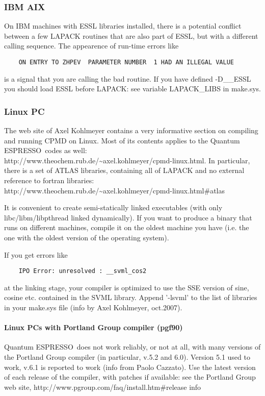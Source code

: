 \documentclass[12pt,a4paper]{article}
\def\qe{{\sc Quantum ESPRESSO}}
\begin{document}
\subsubsection{IBM AIX}
On IBM machines with ESSL libraries installed, there is a 
potential conflict between a few LAPACK routines that are also part of ESSL, 
but with a different calling sequence. The appearence of run-time errors like
\begin{verbatim}
    ON ENTRY TO ZHPEV  PARAMETER NUMBER  1 HAD AN ILLEGAL VALUE
\end{verbatim}
is a signal that you are calling the bad routine. If you have defined 
-D\_\_ESSL you should load ESSL before LAPACK: see variable
LAPACK\_LIBS in make.sys.

\subsubsection{Linux PC}
The web site of Axel Kohlmeyer contains a very informative
section on compiling and running CPMD on Linux. Most of its contents
applies to the \qe\ codes as well:\\
http://www.theochem.rub.de/\~{}axel.kohlmeyer/cpmd-linux.html. In
particular, there is a set of ATLAS libraries, containing all of
LAPACK and no external reference to fortran libraries:\\
http://www.theochem.rub.de/\~{}axel.kohlmeyer/cpmd-linux.html\#atlas 
    
It is convenient to create semi-statically linked executables (with only
libc/libm/libpthread linked dynamically). If you want to produce a binary
that runs on different machines, compile it on the oldest machine you have
(i.e. the one with the oldest version of the operating system).

If you get errors like 
\begin{verbatim}
    IPO Error: unresolved : __svml_cos2
\end{verbatim}
at the linking stage, your compiler is optimized to use the SSE
version of sine, cosine etc. contained in the SVML library. Append
'-lsvml' to the list of libraries in your make.sys file (info by Axel
Kohlmeyer, oct.2007). 

\paragraph{Linux PCs with Portland Group compiler (pgf90)}
\qe\ does not work reliably, or not at all, with many
versions of the Portland Group compiler (in particular, v.5.2 and
6.0). Version 5.1 used to work, v.6.1 is reported to work (info from
Paolo Cazzato). Use the latest version of each release of the
compiler, with patches if available: 
see the Portland Group web site,
http://www.pgroup.com/faq/install.htm\#release info
\end{document}
